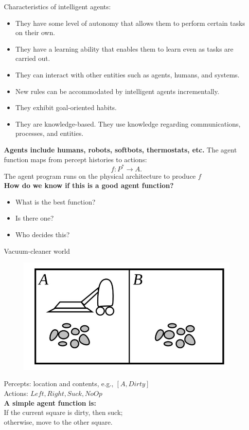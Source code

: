 \documentclass{beamer}
\begin{document}
	\begin{frame}
		Characteristics of intelligent agents:
		\begin{itemize}
			\item They have some level of autonomy that allows them to perform certain tasks on their own.
			\item They have a learning ability that enables them to learn even as tasks are carried out.
			\item They can interact with other entities such as agents, humans, and systems.
			\item New rules can be accommodated by intelligent agents incrementally.
			\item They exhibit goal-oriented habits.
			\item They are knowledge-based. They use knowledge regarding communications, processes, and entities.
		\end{itemize}
		
	\end{frame}
	
	\begin{frame}
		\textbf{Agents include humans, robots, softbots, thermostats, etc.}
		The agent function maps from percept histories to actions:
		\begin{equation}
			f \colon P^{*} \to A .
		\end{equation}
		The agent program runs on the physical architecture to produce	$f$ \\
		\textbf{How do we know if this is a good agent function?} \\
		\begin{itemize}
			\item What is the best function?
			\item Is there one? 
			\item Who decides this? 
		\end{itemize}		
	\end{frame}
	\begin{frame}
		Vacuum-cleaner world
		\begin{figure}
			\includegraphics[scale=0.25]{vc.jpeg}
		\end{figure}
		Percepts: location and contents, e.g., $[A, Dirty]$ \\
		Actions: $Left, Right, Suck, NoOp$ \\
		\textbf{A simple agent function is:} \\
		If the current square is dirty, then suck; \\
		otherwise, move to the other square.
	\end{frame}
\end{document}
